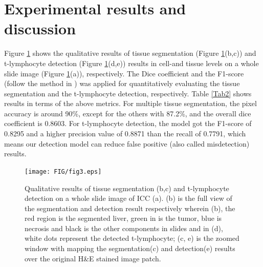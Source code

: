 \documentclass[num-refs]{wiley-article}
\begin{document}
\section{Experimental results and discussion}\label{result}
Figure \ref{fig3} shows the qualitative results of tissue segmentation (Figure \ref{fig3}(b,c)) and t-lymphocyte detection (Figure \ref{fig3}(d,e)) results in cell-and tissue levels on a whole slide image (Figure \ref{fig3}(a)), respectively. The Dice coefficient and the F1-score (follow the method in \cite{sirinukunwattana2016locality}) was applied for quantitatively evaluating the tissue segmentation and the t-lymphocyte detection, respectively. Table \ref{Tab2} shows results in terms of the above metrics. For multiple tissue segmentation, the pixel accuracy is around 90\%, except for the others with 87.2\%, and the overall dice coefficient is 0.8603. For t-lymphocyte detection, the model got the F1-score of 0.8295 and a higher precision value of 0.8871 than the recall of 0.7791, which means our detection model can reduce false positive (also called misdetection) results. 

\begin{figure}[h!]
\centering
\texttt{[image: FIG/fig3.eps]}
\caption{Qualitative results of tissue segmentation (b,c) and t-lymphocyte detection on a whole slide image of ICC (a). (b) is the full view of the segmentation and detection result respectively wherein (b), the red region is the segmented liver, green in is the tumor, blue is necrosis and black is the other components in slides and in (d), white dots represent the detected t-lymphocyte; (c, e) is the zoomed window with mapping the segmentation(c) and detection(e) results over the original H\&E stained image patch.}
\label{fig3}
\end{figure}
\end{document}

